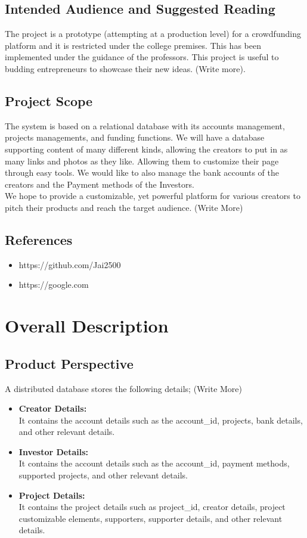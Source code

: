\documentclass{report}[12pt]
\begin{document}
\section{Intended Audience and Suggested Reading}
The project is a prototype (attempting at a production level) for a crowdfunding platform and it is restricted under the college premises. This has been implemented under the guidance of the professors. This project is useful to budding entrepreneurs to showcase their new ideas. (Write more).

\section{Project Scope}
The system is based on a relational database with its accounts management, projects managements, and funding functions. We will have a database supporting content of many different kinds, allowing the creators to put in as many links and photos as they like. Allowing them to customize their page through easy tools. We would like to also manage the bank accounts of the creators and the Payment methods of the Investors.\\ 
We hope to provide a customizable, yet powerful platform for various creators to pitch their products and reach the target audience. (Write More)

\section{References}
\begin{itemize}
    \item https://github.com/Jai2500
    \item https://google.com
\end{itemize}

\chapter{Overall Description}
\section{Product Perspective}
A distributed database stores the following details; (Write More)
\begin{itemize}
    \item \textbf{Creator Details: }\\
    It contains the account details such as the account\_id, projects, bank details, and other relevant details.
    \item \textbf{Investor Details: }\\
    It contains the account details such as the account\_id, payment methods, supported projects, and other relevant details.
    \item \textbf{Project Details: }\\
    It contains the project details such as project\_id, creator details, project customizable elements, supporters, supporter details, and other relevant details. 
\end{itemize}
\end{document}
